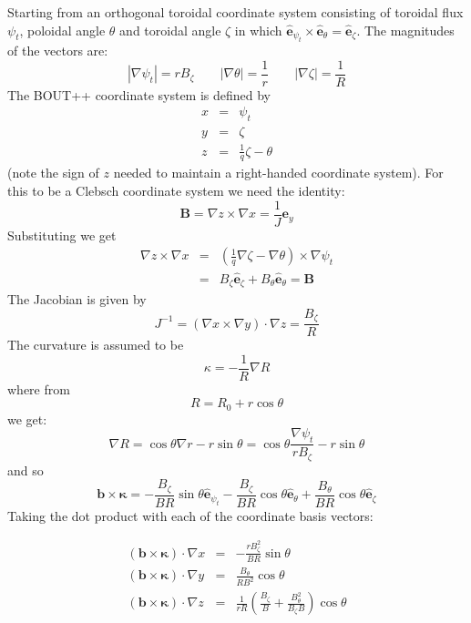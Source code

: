 \documentclass[12pt,a4paper]{article}
\begin{document}
Starting from an orthogonal toroidal coordinate system consisting of toroidal flux $\psi_t$, poloidal angle $\theta$
and toroidal angle $\zeta$ in which $\mathbf{\hat{e}}_{\psi_t} \times \mathbf{\hat{e}}_\theta = \mathbf{\hat{e}}_\zeta$.
The magnitudes of the vectors are:
\[
\left|\nabla \psi_t\right| = rB_\zeta \qquad \left|\nabla \theta\right| = \frac{1}{r} \qquad \left|\nabla \zeta\right| = \frac{1}{R}
\]
The BOUT++ coordinate system is defined by
\begin{eqnarray}
  x &=& \psi_t \\
  y &=& \zeta \\
  z &=& \frac{1}{q}\zeta - \theta
\end{eqnarray}
(note the sign of $z$ needed to maintain a right-handed coordinate system). For this to be a Clebsch coordinate system
we need the identity:
\begin{equation}
\mathbf{B} = \nabla z \times \nabla x = \frac{1}{J}\mathbf{e}_y
\end{equation}
Substituting we get
\begin{eqnarray}
  \nabla z \times \nabla x &=& \left(\frac{1}{q}\nabla\zeta - \nabla\theta\right)\times\nabla\psi_t \\
  &=& B_\zeta\mathbf{\hat{e}}_\zeta + B_\theta \mathbf{\hat{e}}_\theta = \mathbf{B}
\end{eqnarray}
The Jacobian is given by
\begin{equation}
  J^{-1} = \left(\nabla x \times \nabla y\right) \cdot \nabla z = \frac{B_\zeta}{R}
\end{equation}
The curvature is assumed to be
\begin{equation}
\kappa = -\frac{1}{R}\nabla R
\end{equation}
where from
\[
R = R_0 + r\cos\theta
\]
we get:
\begin{equation}
\nabla R = \cos\theta \nabla r - r \sin\theta = \cos\theta \frac{\nabla \psi_t}{rB_\zeta} - r \sin\theta
\end{equation}
and so
\begin{equation}
  \mathbf{b}\times\mathbf{\kappa} = -\frac{B_\zeta}{BR}\sin\theta \mathbf{\hat{e}}_{\psi_t} - \frac{B_\zeta}{BR}\cos\theta \mathbf{\hat{e}}_\theta + \frac{B_\theta}{BR}\cos\theta \mathbf{\hat{e}}_\zeta
\end{equation}
Taking the dot product with each of the coordinate basis vectors:

\begin{eqnarray}
  \left(\mathbf{b}\times\mathbf{\kappa}\right)\cdot\nabla x &=& -\frac{rB_\zeta^2}{BR}\sin\theta \\
  \left(\mathbf{b}\times\mathbf{\kappa}\right)\cdot\nabla y &=& \frac{B_\theta}{RB^2}\cos\theta \\
  \left(\mathbf{b}\times\mathbf{\kappa}\right)\cdot\nabla z &=& \frac{1}{rR}\left(\frac{B_\zeta}{B} + \frac{B_\theta^2}{B_\zeta B}\right)\cos\theta
\end{eqnarray}
\end{document}
